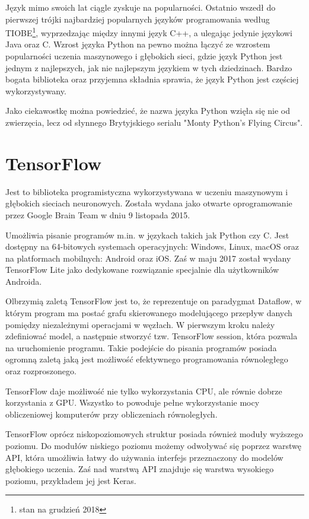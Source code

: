 \documentclass[a4paper,12pt,twoside,openany]{report}
\begin{document}
Język mimo swoich lat ciągle zyskuje na popularności. Ostatnio wszedł do pierwszej trójki najbardziej popularnych języków programowania według TIOBE\footnote{stan na grudzień 2018}, wyprzedzając między innymi język C++, a ulegając jedynie językowi Java oraz C. Wzrost języka Python na pewno można łączyć ze wzrostem popularności uczenia maszynowego i głębokich sieci, gdzie język Python jest jednym z najlepszych, jak nie najlepszym językiem w tych dziedzinach. Bardzo bogata biblioteka oraz przyjemna składnia sprawia, że język Python jest częściej wykorzystywany.  

Jako ciekawostkę można powiedzieć, że nazwa języka Python wzięła się nie od zwierzęcia, lecz od słynnego Brytyjskiego serialu "Monty Python’s Flying Circus".

\section{TensorFlow}
Jest to biblioteka programistyczna wykorzystywana w uczeniu maszynowym i głębokich sieciach neuronowych. Została wydana jako otwarte oprogramowanie przez Google Brain Team w dniu 9 listopada 2015.

Umożliwia pisanie programów m.in. w językach takich jak Python czy C. Jest dostępny na 64-bitowych systemach operacyjnych: Windows, Linux, macOS oraz na platformach mobilnych: Android oraz iOS. Zaś w maju 2017 został wydany TensorFlow Lite jako dedykowane rozwiązanie specjalnie dla użytkowników Androida.

Olbrzymią zaletą TensorFlow jest to, że reprezentuje on paradygmat Dataflow, w którym program ma postać grafu skierowanego modelującego przepływ danych pomiędzy niezależnymi operacjami w węzłach. W pierwszym kroku należy zdefiniować model, a następnie stworzyć tzw. TensorFlow session, która pozwala na uruchomienie programu. Takie podejście do pisania programów posiada ogromną zaletą jaką jest możliwość efektywnego programowania równoległego oraz rozproszonego. 

TensorFlow daje możliwość nie tylko wykorzystania CPU, ale równie dobrze korzystania z GPU. Wszystko to powoduje pełne wykorzystanie mocy obliczeniowej komputerów przy obliczeniach równoległych.

TensorFlow oprócz niskopoziomowych struktur posiada również moduły wyższego poziomu. Do modułów niskiego poziomu możemy odwoływać się poprzez warstwę API, która umożliwia łatwy do używania interfejs przeznaczony do modelów głębokiego uczenia. Zaś nad warstwą API znajduje się warstwa wysokiego poziomu, przykładem jej jest Keras.
\end{document}
